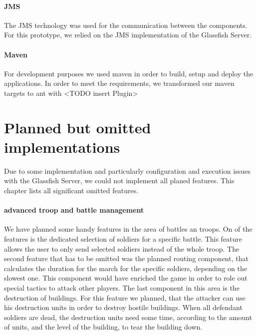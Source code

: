 \documentclass[a4paper]{article}
\begin{document}
\paragraph{JMS}
The JMS technology was used for the communication between the components. For this prototype, we relied on the JMS implementation of the Glassfish Server.

\paragraph{Maven}
For development purposes we used maven in order to build, setup and deploy the applications. In order to meet the requirements, we transformed our maven targets to ant with <TODO insert Plugin>




\section{Planned but omitted implementations}
Due to some implementation and particularly configuration and execution issues with the Glassfish Server, we could not implement all planed features. This chapter lists all significant omitted features.

\paragraph{advanced troop and battle management}
We have planned some handy features in the area of battles an troops. On of the features is the dedicated selection of soldiers for a specific battle. This feature  allows the user to only send selected soldiers instead of the whole troop. The second feature that has to be omitted was the planned routing component, that calculates the duration for the march for the specific soldiers, depending on the slowest one. This component would have enriched the game in order to role out special tactics to attack other players. The last component in this area is the destruction of buildings. For this feature we planned, that the attacker can use his destruction units in order to destroy hostile buildings. When all defendant soldiers are dead, the destruction units need some time, according to the amount of units, and the level of the building, to tear the building down.
\end{document}
